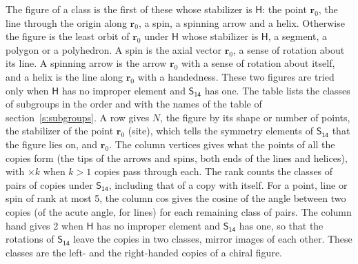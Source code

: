 \documentclass[10pt,a4paper]{article}
\numberwithin{equation}{section}
\newcommand{\grp}[1]{\mathsf{#1}}
\newcommand{\pointr}{\mathbf{r}}
\begin{document}
\leavevmode\label{n:head.figure}The figure of a class is the first of these whose stabilizer is $\grp{H}$: the point $\pointr_0$, the line through the origin along $\pointr_0$, a spin, a spinning arrow and a helix. Otherwise the figure is the least orbit of $\pointr_0$ under $\grp{H}$ whose stabilizer is $\grp{H}$, a segment, a polygon or a polyhedron. A spin is the axial vector $\pointr_0$, a sense of rotation about its line. A spinning arrow is the arrow $\pointr_0$ with a sense of rotation about itself, and a helix is the line along $\pointr_0$ with a handedness. These two figures are tried only when $\grp{H}$ has no improper element and $\grp{S_{14}}$ has one. The table lists the classes of subgroups in the order and with the names of the table of section~\ref{s:subgroups}. \label{n:head.site}A row gives $N$, the figure by its shape or number of points, the stabilizer of the point $\pointr_0$ (site), which tells the symmetry elements of $\grp{S_{14}}$ that the figure lies on, and $\pointr_0$. \label{n:head.vertices}The column vertices gives what the points of all the copies form (the tips of the arrows and spins, both ends of the lines and helices), with ${\times}k$ when $k > 1$ copies pass through each. \label{n:head.rank}The rank counts the classes of pairs of copies under $\grp{S_{14}}$, including that of a copy with itself. \label{n:head.cos}For a point, line or spin of rank at most 5, the column cos gives the cosine of the angle between two copies (of the acute angle, for lines) for each remaining class of pairs. \label{n:head.hand}The column hand gives 2 when $\grp{H}$ has no improper element and $\grp{S_{14}}$ has one, so that the rotations of $\grp{S_{14}}$ leave the copies in two classes, mirror images of each other. These classes are the left- and the right-handed copies of a chiral figure.
\end{document}
